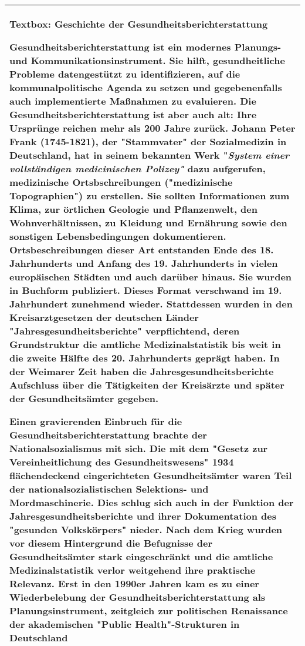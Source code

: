 \documentclass{article}
\begin{document}
\begin{tabu} to \textwidth { |X| }
\hline



\textbf{Textbox: Geschichte der Gesundheitsberichterstattung}


Gesundheitsberichterstattung ist ein modernes Planungs- und Kommunikationsinstrument. Sie hilft, gesundheitliche Probleme datengestützt zu identifizieren, auf die kommunalpolitische Agenda zu setzen und gegebenenfalls auch implementierte Maßnahmen zu evaluieren. Die Gesundheitsberichterstattung ist aber auch alt: Ihre Ursprünge reichen mehr als 200 Jahre zurück. Johann Peter Frank (1745-1821), der "Stammvater" der Sozialmedizin in Deutschland, hat in seinem bekannten Werk "\emph{System einer vollständigen medicinischen Polizey" }dazu aufgerufen, medizinische Ortsbschreibungen ("medizinische Topographien") zu erstellen. Sie sollten Informationen zum Klima, zur örtlichen Geologie und Pflanzenwelt, den Wohnverhältnissen, zu Kleidung und Ernährung sowie den sonstigen Lebensbedingungen dokumentieren. Ortsbeschreibungen dieser Art entstanden Ende des 18. Jahrhunderts und Anfang des 19. Jahrhunderts in vielen europäischen Städten und auch darüber hinaus. Sie wurden in Buchform publiziert. Dieses Format verschwand im 19. Jahrhundert zunehmend wieder. Stattdessen wurden in den Kreisarztgesetzen der deutschen Länder "Jahresgesundheitsberichte" verpflichtend, deren Grundstruktur die amtliche Medizinalstatistik bis weit in die zweite Hälfte des 20. Jahrhunderts geprägt haben. In der Weimarer Zeit haben die Jahresgesundheitsberichte Aufschluss über die Tätigkeiten der Kreisärzte und später der Gesundheitsämter gegeben.


Einen gravierenden Einbruch für die Gesundheitsberichterstattung brachte der Nationalsozialismus mit sich. Die mit dem "Gesetz zur Vereinheitlichung des Gesundheitswesens" 1934 flächendeckend eingerichteten Gesundheitsämter waren Teil der nationalsozialistischen Selektions- und Mordmaschinerie. Dies schlug sich auch in der Funktion der Jahresgesundheitsberichte und ihrer Dokumentation des "gesunden Volkskörpers" nieder. Nach dem Krieg wurden vor diesem Hintergrund die Befugnisse der Gesundheitsämter stark eingeschränkt und die amtliche Medizinalstatistik verlor weitgehend ihre praktische Relevanz. Erst in den 1990er Jahren kam es zu einer Wiederbelebung der Gesundheitsberichterstattung als Planungsinstrument, zeitgleich zur politischen Renaissance der akademischen "Public Health"-Strukturen in Deutschland \autocite{KuhnJosephundweitere2012}
 \\
\hline

\end{tabu}
\end{document}
